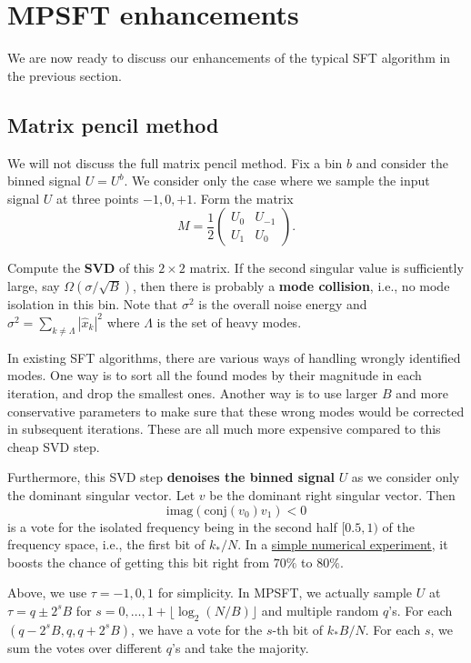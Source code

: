 \documentclass[10pt]{article}
\begin{document}
\section{MPSFT enhancements}

We are now ready to discuss our enhancements of the typical SFT algorithm in the previous section.

\subsection{Matrix pencil method}
We will not discuss the full matrix pencil method. Fix a bin $b$ and consider the binned signal $U=U^b$. We consider only the case where we sample the input signal $U$ at three points $-1, 0, +1$. Form the matrix
$$M = \frac{1}{2} \left( \begin{array}{cc}
U_0 & U_{-1} \\
U_{1} & U_0
\end{array} \right).$$

Compute the \textbf{SVD} of this $2\times 2$ matrix. If the second singular value is sufficiently large, say $\Omega(\sigma/\sqrt{B})$, then there is probably a \textbf{mode collision}, i.e., no mode isolation in this bin. Note that $\sigma^2$ is the overall noise energy and $\sigma^2= \sum_{k\neq \Lambda} |\hat{x}_k|^2$ where $\Lambda$ is the set of heavy modes.

In existing SFT algorithms, there are various ways of handling wrongly identified modes. One way is to sort all the found modes by their magnitude in each iteration, and drop the smallest ones. Another way is to use larger $B$ and more conservative parameters to make sure that these wrong modes would be corrected in subsequent iterations. These are all much more expensive compared to this cheap SVD step.

Furthermore, this SVD step \textbf{denoises the binned signal} $U$ as we consider only the dominant singular vector. Let $v$ be the dominant right singular vector. Then $$\text{imag}(\text{conj}(v_0)v_1)<0$$ is a vote for the isolated frequency being in the second half $[0.5,1)$ of the frequency space, i.e., the first bit of $k_*/N$. In a \href{https://github.com/tinkerstash/mpsft/blob/master/notebook/Mode%20identification.ipynb}{simple numerical experiment}, it boosts the chance of getting this bit right from $70\%$ to $80\%$.

Above, we use $\tau=-1,0,1$ for simplicity. In MPSFT, we actually sample $U$ at $\tau=q \pm 2^s B$ for $s=0,\ldots,1 + \lfloor \log_2 (N/B) \rfloor$ and multiple random $q$'s. For each $(q-2^s B, q, q+2^s B)$, we have a vote for the $s$-th bit of $k_* B/N$. For each $s$, we sum the votes over different $q$'s and take the majority.
\end{document}
